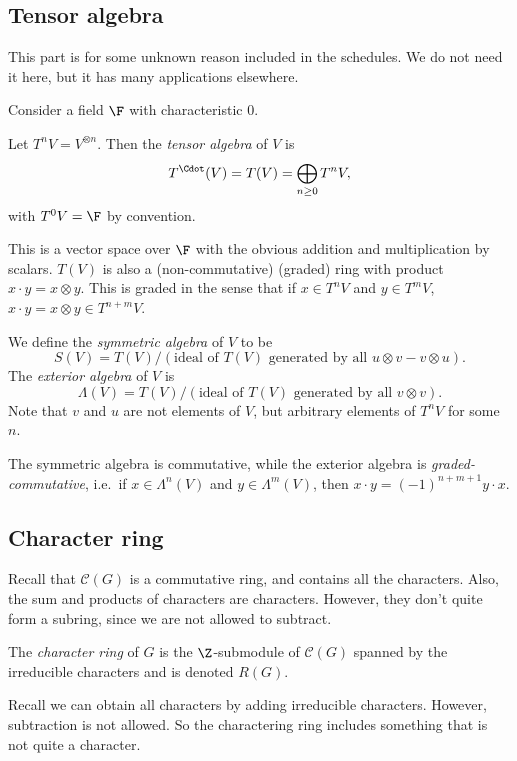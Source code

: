 \documentclass[a4paper]{article}
\begin{document}
\subsection{Tensor algebra}
This part is for some unknown reason included in the schedules. We do not need it here, but it has many applications elsewhere.

Consider a field $\F$ with characteristic $0$.

\begin{defi}
  Let $T^nV = V^{\otimes n}$. Then the \emph{tensor algebra} of $V$ is
  \[
    T^{\Cdot}(V) = T(V) = \bigoplus_{n\geq 0} T^nV,
  \]
  with $T^0V = \F$ by convention.

  This is a vector space over $\F$ with the obvious addition and multiplication by scalars. $T(V)$ is also a (non-commutative) (graded) ring with product $x \cdot y = x\otimes y$. This is graded in the sense that if $x \in T^n V$ and $y \in T^m V$, $x \cdot y = x\otimes y \in T^{n + m}V$.
\end{defi}

\begin{defi}
  We define the \emph{symmetric algebra} of $V$ to be
  \[
    S(V) = T(V) / (\text{ideal of $T(V)$ generated by all $u\otimes v - v\otimes u$}).
  \]
  The \emph{exterior algebra} of $V$ is
  \[
    \Lambda(V) = T(V) / (\text{ideal of $T(V)$ generated by all $v \otimes v$}).
  \]
  Note that $v$ and $u$ are not elements of $V$, but arbitrary elements of $T^n V$ for some $n$.
\end{defi}
The symmetric algebra is commutative, while the exterior algebra is \emph{graded-commutative}, i.e.\ if $x \in \Lambda^n(V)$ and $y \in \Lambda^m(V)$, then $x\cdot y = (-1)^{n + m + 1} y \cdot x$.

\subsection{Character ring}
Recall that $\mathcal{C}(G)$ is a commutative ring, and contains all the characters. Also, the sum and products of characters are characters. However, they don't quite form a subring, since we are not allowed to subtract.

\begin{defi}
  The \emph{character ring} of $G$ is the $\Z$-submodule of $\mathcal{C}(G)$ spanned by the irreducible characters and is denoted $R(G)$.
\end{defi}
Recall we can obtain all characters by adding irreducible characters. However, subtraction is not allowed. So the charactering ring includes something that is not quite a character.
\end{document}
